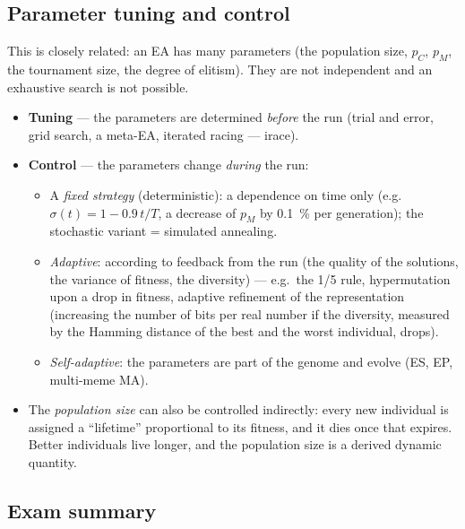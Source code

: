 \documentclass[11pt,a4paper]{article}
\theoremstyle{definition}
\providecommand{\uv}[1]{``#1''}
\begin{document}
\subsection{Parameter tuning and control}

This is closely related: an EA has many parameters (the population size, $p_C$,
$p_M$, the tournament size, the degree of elitism). They are not independent and
an exhaustive search is not possible.
\begin{itemize}
\item \textbf{Tuning} --- the parameters are determined \emph{before} the run
  (trial and error, grid search, a meta-EA, iterated racing --- irace).
\item \textbf{Control} --- the parameters change \emph{during} the run:
  \begin{itemize}
  \item A \emph{fixed strategy} (deterministic): a dependence on time only
    (e.g.\ $\sigma(t) = 1 - 0.9\,t/T$, a decrease of $p_M$ by 0.1~\% per
    generation); the stochastic variant = simulated annealing.
  \item \emph{Adaptive}: according to feedback from the run (the quality of the
    solutions, the variance of fitness, the diversity) --- e.g.\ the 1/5 rule,
    hypermutation upon a drop in fitness, adaptive refinement of the
    representation (increasing the number of bits per real number if the
    diversity, measured by the Hamming distance of the best and the worst
    individual, drops).
  \item \emph{Self-adaptive}: the parameters are part of the genome and evolve
    (ES, EP, multi-meme MA).
  \end{itemize}
\item The \emph{population size} can also be controlled indirectly: every new
  individual is assigned a \uv{lifetime} proportional to its fitness, and it
  dies once that expires. Better individuals live longer, and the population
  size is a derived dynamic quantity.
\end{itemize}

\subsection{Exam summary}
\end{document}
